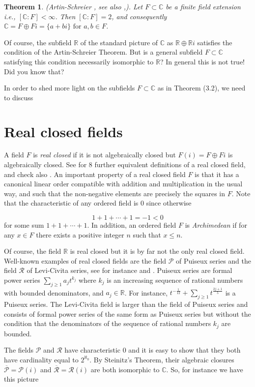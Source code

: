\documentclass[11pt]{article}
\theoremstyle{plain}
\newtheorem{theorem}{Theorem}[section]
\theoremstyle{definition}
\theoremstyle{remark}
\begin{document}
\begin{theorem}
    (Artin-Schreier \textnormal{\cite{ArtinSchreier}}, see also \textnormal{\cite[Ch.XI]{Lang},\cite{ConradArtinSchreier}}). Let $F\subset\mathbb{C}$ be a finite field extension i.e., $[\mathbb{C}:F] < \infty$. Then $[\mathbb{C}:F] = 2$, and consequently $\mathbb{C} = F \oplus Fi = \{a + bi\} \textrm{ for } a,b \in F $.
\end{theorem}

Of course, the subfield $\mathbb{R}$ of the standard picture of $\mathbb{C}$ as $\mathbb{R} \oplus \mathbb{R}i$ satisfies the condition of the Artin-Schreier Theorem. But is a general subfield $F\subset \mathbb{C}$ satisfying this condition necessarily isomorphic to $\mathbb{R}$?
In general this is not true! Did you know that?


In order to shed more light on the subfields $F\subset\mathbb{C}$ as in Theorem (3.2), we need to discuss

\section{Real closed fields}

A field $F$ is \textit{real closed} if it is not algebraically closed but $F(i) = F \oplus Fi$ is algebraically closed. See \cite{RealClosedFieldWiki}   for 8 further equivalent definitions of a real closed field, and check also \cite[Ch.XI]{Lang}. An important property of a real closed field $F$ is that it has a canonical linear order compatible with addition and multiplication in  the usual way, and such that the non-negative elements are precisely the squares in $F$. Note that the characteristic of any ordered field is 0 since otherwise 

$$1+1+ \cdots +1 = -1 < 0$$
for some sum $1+1+ \cdots +1$. In addition, an ordered field $F$ is \textit{Archimedean} if for any $x\in F$ there exists a positive integer $n$ such that $x \leqslant n$. 

Of course, the field $\mathbb{R}$ is real closed but it is by far not the only real closed field. Well-known examples of real closed fields are the field $\mathcal{P}$ of Puiseux series and the field $\mathcal{R}$ of Levi-Civita series, see for instance \cite[Prop.~II.8]{Serre} and \cite{Ribenboim1992}. Puiseux series are formal power series $ \sum_{j\geqslant1}a_j t^{k_j}$ where ${k_j}$ is an increasing sequence of rational numbers with bounded denominators, and $a_j \in \mathbb{R}$. For instance, $ t^{-\frac{1}{12}} + \sum_{j \geqslant 1} t^{\frac{2j+1}{5}}$ is a Puiseux series. The Levi-Civita field is larger than the field of Puiseux series and consists of formal power series of the same form as Puiseux series but without the condition that the denominators of the sequence of rational numbers ${{k_j}}$ are bounded.
\par
The fields $\mathcal{P}$ and $\mathcal{R}$ have characteristic 0 and it is easy to show that they both have cardinality equal to $2^{\aleph_0}$. By Steinitz's Theorem, their algebraic closures $\overline{\mathcal{P}} = \mathcal{P}(i)$ and $\overline{\mathcal{R}} = \mathcal{R}(i)$ are both isomorphic to $\mathbb{C}$. So, for instance we have this picture
\end{document}
